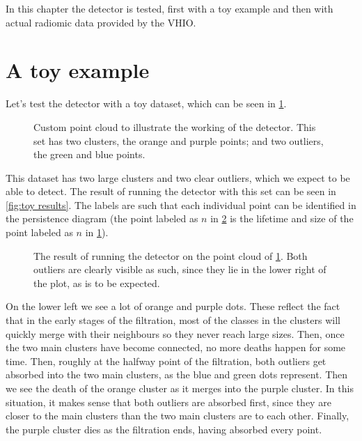 \documentclass[../main.tex]{subfiles}
\begin{document}
In this chapter the detector is tested, first with a toy example and then with actual
radiomic data provided by the VHIO. 

\section{A toy example}
Let's test the detector with a toy dataset, which can be seen in \cref{fig:clusters}.
\begin{figure}[htb]
	\centering \small \sffamily
	
	\caption{Custom point cloud to illustrate the working of the detector. This set has two
	clusters, the orange and purple points; and two outliers, the green and blue points.}
	\label{fig:clusters}
\end{figure}
This dataset has two large clusters and two clear outliers, which we expect to be able to
detect. The result of running the detector with this set can be seen in \cref{fig:toy
results}. The labels are such that each individual point can be identified in the
persistence diagram (the point labeled as \( n \) in \cref{fig:toy results} is the
lifetime and size of the point labeled as \( n \) in \cref{fig:clusters}). 
\begin{figure}[htb]
	\centering \small \sffamily
	
	\caption{The result of running the detector on the point cloud of \cref{fig:clusters}.
		Both outliers are clearly visible as such, since they lie in the lower right of the
	plot, as is to be expected.}
	\label{fig:toy results}
\end{figure}
On the lower left we see a lot of orange and purple dots. These reflect the fact that in
the early stages of the filtration, most of the classes in the clusters will quickly merge
with their neighbours so they never reach large sizes. Then, once the two main clusters
have become connected, no more deaths happen for some time. Then, roughly at the halfway
point of the filtration, both outliers get absorbed into the two main clusters, as the
blue and green dots represent. Then we see the death of the orange cluster as it merges
into the purple cluster. In this situation, it makes sense that both outliers are absorbed
first, since they are closer to the main clusters than the two main clusters are to each
other. Finally, the purple cluster dies as the filtration ends, having absorbed every
point. 
\end{document}
